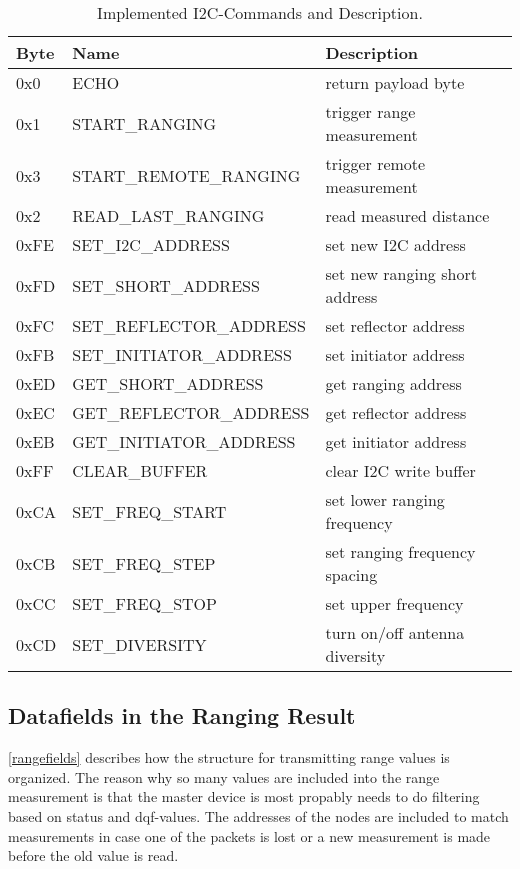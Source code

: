 \begin{table}
	
	\begin{tabularx}{\textwidth}{l | l | X}
	Byte & Name & Description \\ \hline
	0x0  & ECHO & return payload byte\\
	0x1  & START\_RANGING & trigger range measurement\\
	0x3  & START\_REMOTE\_RANGING & trigger remote measurement\\
	0x2  & READ\_LAST\_RANGING & read measured distance\\
	0xFE & SET\_I2C\_ADDRESS & set new I2C address\\
	0xFD & SET\_SHORT\_ADDRESS & set new ranging short address\\
	0xFC & SET\_REFLECTOR\_ADDRESS & set reflector address\\
	0xFB & SET\_INITIATOR\_ADDRESS & set initiator address\\
	0xED & GET\_SHORT\_ADDRESS & get ranging address\\
	0xEC & GET\_REFLECTOR\_ADDRESS & get reflector address\\
	0xEB & GET\_INITIATOR\_ADDRESS & get initiator address\\
	0xFF & CLEAR\_BUFFER & clear I2C write buffer\\
	0xCA & SET\_FREQ\_START & set lower ranging frequency\\
	0xCB & SET\_FREQ\_STEP & set ranging frequency spacing\\
	0xCC & SET\_FREQ\_STOP & set upper frequency\\
	0xCD & SET\_DIVERSITY & turn on/off antenna diversity\\
	\end{tabularx}

	\caption[Implemented I2C-Commands and Description]{Implemented I2C-Commands and Description.}
	\label{i2ccommands}
	
\end{table}

\subsection{Datafields in the Ranging Result}
\autoref{rangefields} describes how the structure for transmitting range values is organized.
The reason why so many values are included into the range measurement is that the master device is most propably needs to do filtering based on status and dqf-values. The addresses of the nodes are included to match measurements in case one of the packets is lost or a new measurement is made before the old value is read.

